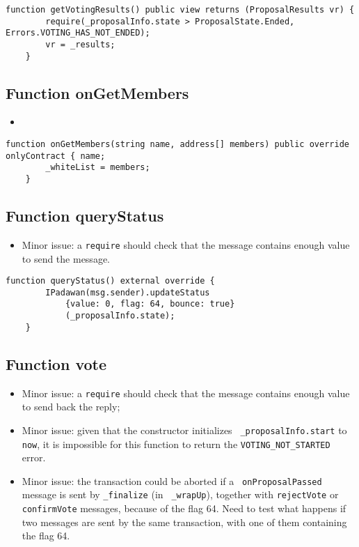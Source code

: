\begin{lstlisting}[firstnumber=203]
    function getVotingResults() public view returns (ProposalResults vr) {
        require(_proposalInfo.state > ProposalState.Ended, Errors.VOTING_HAS_NOT_ENDED);
        vr = _results;
    }
\end{lstlisting}

\subsection{Function onGetMembers}

\begin{itemize}
\item {}
\end{itemize}

\begin{lstlisting}[firstnumber=220]
    function onGetMembers(string name, address[] members) public override onlyContract { name;
        _whiteList = members;
    }
\end{lstlisting}

\subsection{Function queryStatus}

\begin{itemize}
\item Minor issue: a {\tt require} should check that the message
  contains enough value to send the message.
\end{itemize}

\begin{lstlisting}[firstnumber=191]
    function queryStatus() external override {
        IPadawan(msg.sender).updateStatus
            {value: 0, flag: 64, bounce: true}
            (_proposalInfo.state);
    }
\end{lstlisting}

\subsection{Function vote}

\begin{itemize}
\item Minor issue: a {\tt require} should check that the message
  contains enough value to send back the reply;
\item Minor issue: given that the constructor initializes {\tt
  \_proposalInfo.start} to {\tt now}, it is impossible for this
  function to return the {\tt VOTING\_NOT\_STARTED} error.
\item Minor issue: the transaction could be aborted if a {\tt
  onProposalPassed} message is sent by {\tt \_finalize} (in {\tt
  \_wrapUp}), together with {\tt rejectVote} or {\tt confirmVote}
  messages, because of the flag 64.  Need to test what happens if two
  messages are sent by the same transaction, with one of them
  containing the flag 64.
\end{itemize}


